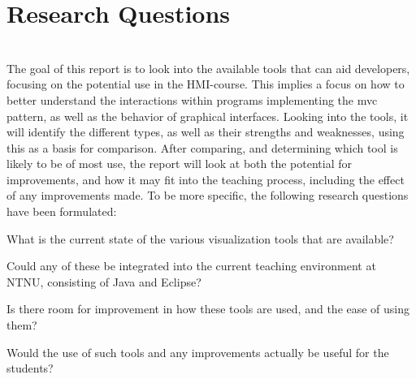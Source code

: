 \section{Research Questions}\label{intro-RQs}
~\\
The goal of this report is to look into the available tools that can aid developers, focusing on the potential use in the HMI-course.
This implies a focus on how to better understand the interactions within programs implementing the \gls{mvc} pattern, as well as the behavior of graphical interfaces.
Looking into the tools, it will identify the different types, as well as their strengths and weaknesses, using this as a basis for comparison.
After comparing, and determining which tool is likely to be of most use, the report will look at both the potential for improvements, and how it may fit into the teaching process, including the effect of any improvements made.
To be more specific, the following research questions have been formulated:
\begin{theorem}
What is the current state of the various visualization tools that are available?
\end{theorem}
\begin{theorem}
Could any of these be integrated into the current teaching environment at NTNU, consisting of Java and Eclipse? %
\end{theorem}
\begin{theorem}
Is there room for improvement in how these tools are used, and the ease of using them? %
\end{theorem}
\begin{theorem}
Would the use of such tools and any improvements actually be useful for the students?%
\end{theorem}
